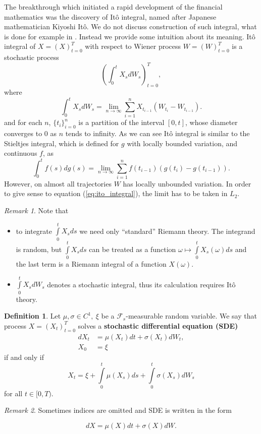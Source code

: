 \documentclass[a4paper,11pt, twoside]{book}
\theoremstyle{definition}
\newtheorem{mydef}{Definition}[chapter]
\theoremstyle{remark}
\newtheorem{remark}{Remark}[chapter]
\newcounter{example}[chapter]
\begin{document}
The breakthrough which initiated a rapid development of the financial mathematics was the discovery of It\^{o} integral, named after Japanese mathematician Kiyoshi It\^{o}. We do not discuss construction of such integral, what is done for example in \cite{latala}.
Instead we provide some intuition about its meaning. It\^{o} integral of $X=(X)_{t=0}^T$ with respect to Wiener process $W=(W)_{t=0}^T$ is a stochastic process
\[ \left( \int_0^{t} X_s dW_s \right)_{t = 0}^T, \]
where
\begin{equation}
 \label{eq:ito_integral}
  \int_0^{t} X_s dW_s = \lim_{n \rightarrow \infty} \sum\limits_{i=1}^n X_{t_{i-1}} (W_{t_i} - W_{t_{i-1}}).
\end{equation}
and for each $n$, $\{t_i\}_{i=0}^n$ is a partition of the interval $[0,t]$, whose diameter converges to 0 as $n$ tends to infinity.
As we can see It\^{o} integral is similar to the Stieltjes integral, which is defined for $g$ with locally bounded variation, and continuous $f$, as
\[  \int_0^{t} f(s) dg(s) = \lim_{n \rightarrow \infty} \sum\limits_{i=1}^n f(t_{i-1}) (g(t_i) - g(t_{i-1})). \]
However, on almost all trajectories $W$ has locally unbounded variation. In order to give sense to equation (\ref{eq:ito_integral}), the limit has to be taken in $L_2$.

\begin{remark} Note that
\begin{itemize}
 \item to integrate $\int\limits_0^t X_s ds$ we need only ``standard'' Riemann theory. The integrand is random, but $\int\limits_0^t X_s ds$ can be treated as a function $\omega \mapsto \int\limits_0^t X_s(\omega) ds$ and the last term is a Riemann integral of a function $X(\omega)$.
 \item $\int\limits_0^t X_s dW_s$ denotes a stochastic integral, thus its calculation requires It\^{o} theory.
\end{itemize}
\end{remark}


\begin{mydef}
\label{def:SDE}
 Let $\mu, \sigma \in C^1,\ \xi$ be a $\mathcal{F}_s$-measurable random variable. We say that process $X=(X_t)_{t=0}^T$ solves a \textbf{stochastic differential equation (SDE)}
 \begin{equation*}
 \begin{split}
   dX_t &= \mu(X_t)dt + \sigma(X_t) dW_t,\\
   X_0 &= \xi  
 \end{split}  
 \end{equation*}
 if and only if
 \[X_t = \xi + \int\limits_0^t \mu(X_s)ds + \int\limits_0^t\sigma(X_s) dW_s\]
for all $t \in [0,T)$.
\end{mydef}
\begin{remark}
 Sometimes indices are omitted and SDE is written in the form
\end{remark}
\[ dX = \mu(X)dt + \sigma(X) dW. \]
\end{document}
